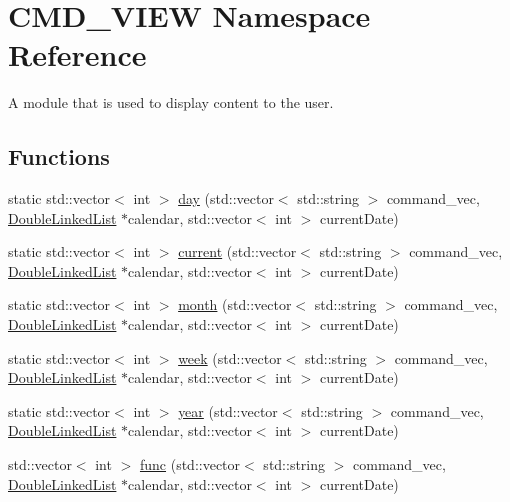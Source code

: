\hypertarget{namespaceCMD__VIEW}{\section{C\-M\-D\-\_\-\-V\-I\-E\-W Namespace Reference}
\label{namespaceCMD__VIEW}
}


A module that is used to display content to the user.  


\subsection*{Functions}
\begin{DoxyCompactItemize}
\item 
static std\-::vector$<$ int $>$ \hyperlink{group__CMD__VIEW_ga32d55ec99d38b5cd97d79445bbef0f55}{day} (std\-::vector$<$ std\-::string $>$ command\-\_\-vec, \hyperlink{classDoubleLinkedList}{Double\-Linked\-List} $\ast$calendar, std\-::vector$<$ int $>$ current\-Date)
\item 
static std\-::vector$<$ int $>$ \hyperlink{group__CMD__VIEW_ga765b53b18977b65084841a0c174e8e89}{current} (std\-::vector$<$ std\-::string $>$ command\-\_\-vec, \hyperlink{classDoubleLinkedList}{Double\-Linked\-List} $\ast$calendar, std\-::vector$<$ int $>$ current\-Date)
\item 
static std\-::vector$<$ int $>$ \hyperlink{group__CMD__VIEW_ga8439916f325db0849234ae3986f79200}{month} (std\-::vector$<$ std\-::string $>$ command\-\_\-vec, \hyperlink{classDoubleLinkedList}{Double\-Linked\-List} $\ast$calendar, std\-::vector$<$ int $>$ current\-Date)
\item 
static std\-::vector$<$ int $>$ \hyperlink{group__CMD__VIEW_ga91f5f2e0e36fb63759f10cbef6eb3366}{week} (std\-::vector$<$ std\-::string $>$ command\-\_\-vec, \hyperlink{classDoubleLinkedList}{Double\-Linked\-List} $\ast$calendar, std\-::vector$<$ int $>$ current\-Date)
\item 
static std\-::vector$<$ int $>$ \hyperlink{group__CMD__VIEW_ga2fb60e4917effba97d815318e91cced7}{year} (std\-::vector$<$ std\-::string $>$ command\-\_\-vec, \hyperlink{classDoubleLinkedList}{Double\-Linked\-List} $\ast$calendar, std\-::vector$<$ int $>$ current\-Date)
\item 
std\-::vector$<$ int $>$ \hyperlink{group__CMD__VIEW_gab9f53f36db853a3fac4e20a7f2747245}{func} (std\-::vector$<$ std\-::string $>$ command\-\_\-vec, \hyperlink{classDoubleLinkedList}{Double\-Linked\-List} $\ast$calendar, std\-::vector$<$ int $>$ current\-Date)
\end{DoxyCompactItemize}
